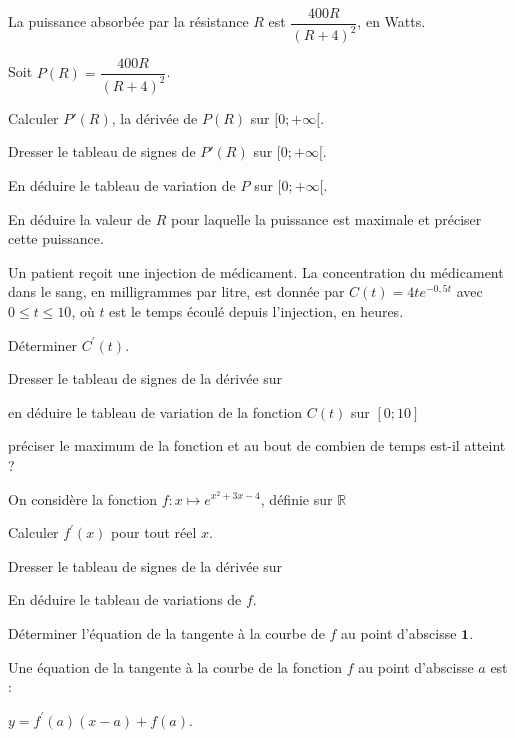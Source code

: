 \documentclass[11pt,a4paper]{article}  %
\begin{document}
La puissance absorbée par la résistance $R$ est $\dfrac{400 R}{(R+4)^2}$, en Watts.

\begin{enumMet}
	\item Soit $P(R)=\dfrac{400 R}{(R+4)^2}$.
	\begin{enumMet}
		\item Calculer $P'(R)$, la dérivée de $P(R)$ sur $[0 ;+\infty[$.
		\item Dresser le tableau de signes de $P'(R)$ sur $[0 ;+\infty[$.
		\item En déduire le tableau de variation de $P$ sur $[0 ;+\infty[$.
	\end{enumMet}
	\item En déduire la valeur de $R$ pour laquelle la puissance est maximale et préciser cette puissance.
\end{enumMet}


Un patient reçoit une injection de médicament. La concentration du médicament dans le sang, en milligrammes par litre, est donnée par $C(t)=4 t e^{-0,5 t}$ avec $0 \leqslant t \leqslant 10$, où $t$ est le temps écoulé depuis l'injection, en heures.
\begin{enumMet}
	\item Déterminer $C^{\prime}(t)$.
	\item Dresser le tableau de signes de la dérivée sur \R
	\item en déduire le tableau de variation de la fonction $C(t)$ sur $[0;10]$
	\item préciser le maximum de la fonction et au bout de combien de temps est-il atteint ?
\end{enumMet}

\newpage


On considère la fonction $f: x \mapsto e^{x^2+3 x-4}$, définie sur $\mathbb{R}$
\begin{enumMet}
	\item Calculer $f^{\prime}(x)$ pour tout réel $x$.
	\item Dresser le tableau de signes de la dérivée sur \R
	\item En déduire le tableau de variations de $f$.
	\item Déterminer l'équation de la tangente à la courbe de $f$ au point d'abscisse $\mathbf{1}$.
	\begin{bprop}
		Une équation de la tangente à la courbe de la fonction $f$ au point d'abscisse $a$ est :

		$y=f^{\prime}(a)(x-a)+f(a)$.
	\end{bprop}
\end{enumMet}
\end{document}
